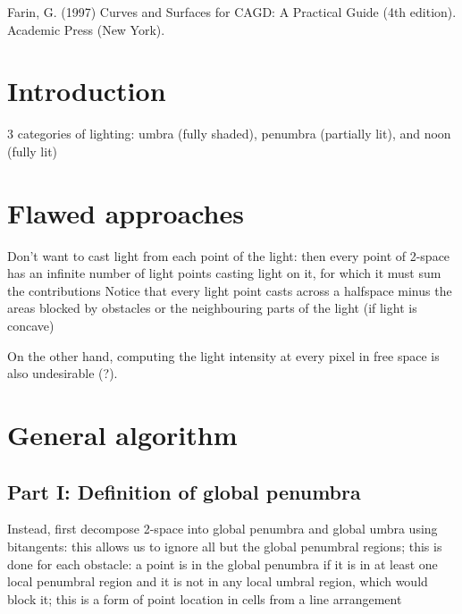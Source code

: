 \documentclass[12pt]{article}
\begin{document}

% 
\begin{thebibliography}{99}

Farin, G. (1997)
Curves and Surfaces for CAGD: A Practical Guide (4th edition).
Academic Press (New York).

\end{thebibliography}

			
\section{Introduction}

3 categories of lighting: umbra (fully shaded), penumbra (partially lit), 
	and noon (fully lit)

\section{Flawed approaches}

Don't want to cast light from each point of the light: 
	then every point of 2-space
	has an infinite number of light points casting light on it,
	for which it must sum the contributions
	Notice that every light point casts across a halfspace minus the
	areas blocked by obstacles or the neighbouring parts of the light (if
	light is concave)
	
On the other hand, computing the light intensity at every pixel
	in free space is also undesirable (?).
	
			
\section{General algorithm}

\subsection{Part I: Definition of global penumbra}

Instead, first decompose 2-space into global penumbra and global umbra using bitangents:
	this allows us to ignore all but the global penumbral regions;
	this is done for each obstacle: a point is in the global penumbra
	if it is in at least one local penumbral region and it is not in any
	local umbral region, which would block it;
	this is a form of point location in cells from a line arrangement
			
\end{document}
